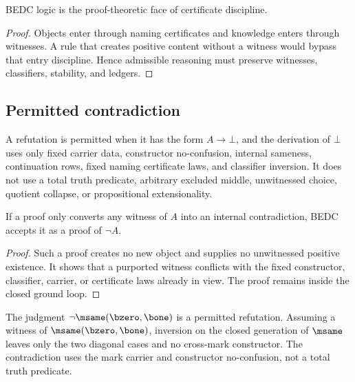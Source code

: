 \begin{corollary}
\label{cor:philosophy-logic-follows-certificate-discipline}
BEDC logic is the proof-theoretic face of certificate discipline.
\end{corollary}
\begin{proof}
Objects enter through naming certificates and knowledge enters through
witnesses. A rule that creates positive content without a witness would
bypass that entry discipline. Hence admissible reasoning must preserve
witnesses, classifiers, stability, and ledgers.
\end{proof}

\subsection{Permitted contradiction}
\label{subsec:philosophy-permitted-contradiction}

\begin{definition}
\label{def:philosophy-permitted-refutation}
A refutation is permitted when it has the form \(A\to\bot\), and the
derivation of \(\bot\) uses only fixed carrier data, constructor
no-confusion, internal sameness, continuation rows, fixed naming
certificate laws, and classifier inversion. It does not use a total
truth predicate, arbitrary excluded middle, unwitnessed choice,
quotient collapse, or propositional extensionality.
\end{definition}

\begin{theorem}
\label{thm:philosophy-negative-proof-accepted-locally}
If a proof only converts any witness of \(A\) into an internal
contradiction, BEDC accepts it as a proof of \(\neg A\).
\end{theorem}
\begin{proof}
Such a proof creates no new object and supplies no unwitnessed positive
existence. It shows that a purported witness conflicts with the fixed
constructor, classifier, carrier, or certificate laws already in view.
The proof remains inside the closed ground loop.
\end{proof}

\begin{example}
\label{ex:philosophy-mark-no-confusion-refutation}
The judgment \(\neg\msame(\bzero,\bone)\) is a permitted refutation.
Assuming a witness of \(\msame(\bzero,\bone)\), inversion on the closed
generation of \(\msame\) leaves only the two diagonal cases and no
cross-mark constructor. The contradiction uses the mark carrier and
constructor no-confusion, not a total truth predicate.
\end{example}

